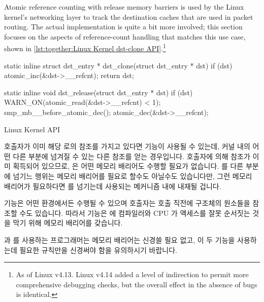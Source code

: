 Atomic reference counting with release memory barriers is used by the
Linux kernel's networking layer to track the destination caches that
are used in packet routing.
The actual implementation is quite a bit more involved; this section
focuses on the aspects of  reference-count
handling that matches this use case,
shown in \cref{lst:together:Linux Kernel dst-clone API}.\footnote{
	As of Linux v4.13.
	Linux v4.14 added a level of indirection to permit more
	comprehensive debugging checks, but the overall effect in the
	absence of bugs is identical.}

\fi

\begin{listing}[tbp]
\begin{fcvlabel}
\begin{VerbatimL}[commandchars=\\\[\]]
static inline
struct dst_entry * dst_clone(struct dst_entry * dst)
{
	if (dst)
		atomic_inc(&dst->__refcnt);
	return dst;
}

static inline
void dst_release(struct dst_entry * dst)
{
	if (dst) {
		WARN_ON(atomic_read(&dst->__refcnt) < 1);
		smp_mb__before_atomic_dec();		\lnlbl[mb]
		atomic_dec(&dst->__refcnt);
	}
}
\end{VerbatimL}
\end{fcvlabel}
\caption{Linux Kernel  API}
\label{lst:together:Linux Kernel dst-clone API}
\end{listing}

호출자가 이미 해당  로의 참조를 가지고 있다면 
기능이 사용될 수 있는데, 커널 내의 어떤 다른 부분에 넘겨질 수 있는 다른 참조를
얻는 경우입니다.
호출자에 의해 참조가 이미 획득되어 있으므로,  은 어떤 메모리
배리어도 수행할 필요가 없습니다.
 를 다른 부분에 넘기느 행위는 메모리 배리어를 필요로 할수도
아닐수도 있습니다만, 그런 메모리 배리어가 필요하다면  를 넘기는데
사용되는 메커니즘 내에 내재될 겁니다.

\begin{fcvref}
 기능은 어떤 환경에서든 수행될 수 있으며 호출자는
 호출 직전에  구조체의 원소들을 참조할 수도
있습니다.
따라서  기능은  에 컴파일러와 CPU 가 액세스를 잘못
순서짓는 것을 막기 위해 메모리 배리어를 갖습니다.
\end{fcvref}

 과  를 사용하는 프로그래머는 메모리 배리어는
신경쓸 필요 없고, 이 두 기능을 사용하는데 필요한 규칙만을 신경써야 함을
유의하시기 바랍니다.

